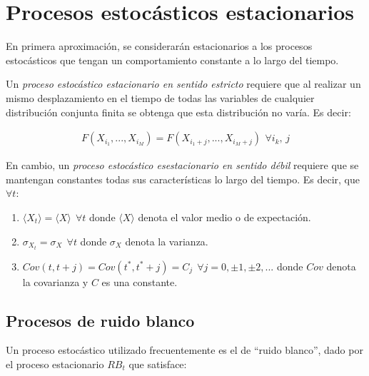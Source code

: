 \section{Procesos estoc\'asticos estacionarios}
\label{CapVI_6}

En primera aproximaci\'on, se considerar\'an estacionarios a los procesos estoc\'asticos que tengan un comportamiento constante a lo 
largo del tiempo. 
%

Un \textsl{proceso estoc\'astico estacionario en sentido estricto} requiere que al realizar un mismo desplazamiento en el tiempo de todas 
las variables de cualquier distribuci\'on conjunta finita se obtenga que esta distribuci\'on no var\'ia.
%
Es decir:

\begin{eqnarray}
	F \left( X_{i_1}, ... , X_{i_M} \right) =   F \left( X_{i_1 + j}, ... , X_{i_M + j} \right) \: \, \forall i_k , \, j
\label{EqLXXXVIII}
\end{eqnarray}


En cambio, un \textsl{proceso estoc\'astico esestacionario en sentido d\'ebil} requiere que se mantengan constantes todas sus 
caracter\'isticas lo largo del tiempo.
%
Es decir, que $\forall t$:

\begin{enumerate}
 \item $\langle X_t \rangle = \langle X \rangle \; \, \forall t$ donde $\langle X \rangle$ denota el valor medio o de expectaci\'on.
 \item $\sigma_{X_t}  = \sigma_{X} \; \, \forall t$ donde $\sigma_{X}$ denota la varianza.
 \item $Cov \left( t, t+j \right) = Cov \left( t^*, t^*+j \right) = C_{j} \, \; \forall j = 0, \pm 1, \pm 2, ...$ donde $Cov$ denota la 
 covarianza y $C$ es una constante.
\end{enumerate}


\subsection{Procesos de ruido blanco}
\label{CapVI_7}

Un proceso estoc\'astico utilizado frecuentemente es el de ``ruido blanco'', dado por el proceso estacionario $RB_{t}$ que satisface:

